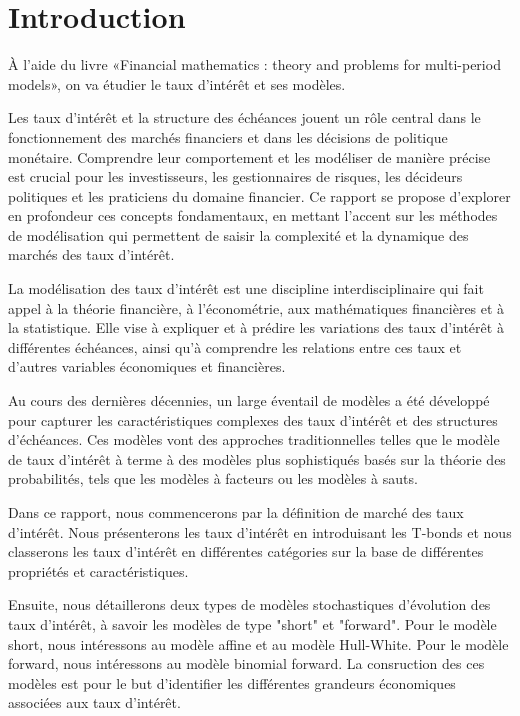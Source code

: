 \chapter*{Introduction} %

À l'aide du livre «Financial mathematics : theory and problems for multi-period models»\cite{pascucci_financial_2012}, on va étudier le taux d'intérêt et ses modèles.

Les taux d'intérêt et la structure des échéances jouent un rôle central dans le fonctionnement des marchés financiers et dans les décisions de politique monétaire. Comprendre leur comportement et les modéliser de manière précise est crucial pour les investisseurs, les gestionnaires de risques, les décideurs politiques et les praticiens du domaine financier. Ce rapport se propose d'explorer en profondeur ces concepts fondamentaux, en mettant l'accent sur les méthodes de modélisation qui permettent de saisir la complexité et la dynamique des marchés des taux d'intérêt.

La modélisation des taux d'intérêt est une discipline interdisciplinaire qui fait appel à la théorie financière, à l'économétrie, aux mathématiques financières et à la statistique. Elle vise à expliquer et à prédire les variations des taux d'intérêt à différentes échéances, ainsi qu'à comprendre les relations entre ces taux et d'autres variables économiques et financières.

Au cours des dernières décennies, un large éventail de modèles a été développé pour capturer les caractéristiques complexes des taux d'intérêt et des structures d'échéances. Ces modèles vont des approches traditionnelles telles que le modèle de taux d'intérêt à terme à des modèles plus sophistiqués basés sur la théorie des probabilités, tels que les modèles à facteurs ou les modèles à sauts.

Dans ce rapport, nous commencerons par la définition de marché des taux d'intérêt. Nous présenterons les taux d'intérêt en introduisant les T-bonds et nous classerons les taux d'intérêt en différentes catégories sur la base de différentes propriétés et caractéristiques.

Ensuite, nous détaillerons deux types de modèles stochastiques d'évolution des taux d'intérêt, à savoir les modèles de type "short" et "forward". Pour le modèle short, nous intéressons au modèle affine et au modèle Hull-White. Pour le modèle forward, nous intéressons au modèle binomial forward. La consruction des ces modèles est pour le but d'identifier les différentes grandeurs économiques associées aux taux d'intérêt.